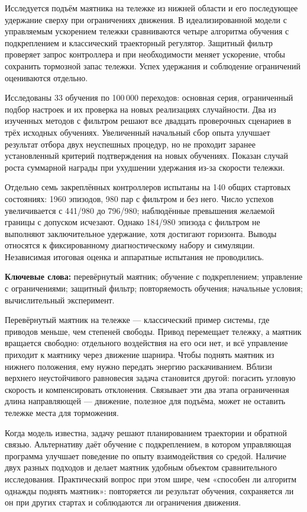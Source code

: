 Исследуется подъём маятника на тележке из нижней области и его последующее удержание сверху при ограничениях движения. В идеализированной модели с управляемым ускорением тележки сравниваются четыре алгоритма обучения с подкреплением и классический траекторный регулятор. Защитный фильтр проверяет запрос контроллера и при необходимости меняет ускорение, чтобы сохранить тормозной запас тележки. Успех удержания и соблюдение ограничений оцениваются отдельно.

Исследованы 33 обучения по 100\,000 переходов: основная серия, ограниченный подбор настроек и их проверка на новых реализациях случайности. Два из изученных методов с фильтром решают все двадцать проверочных сценариев в трёх исходных обучениях. Увеличенный начальный сбор опыта улучшает результат отбора двух неуспешных процедур, но не проходит заранее установленный критерий подтверждения на новых обучениях. Показан случай роста суммарной награды при ухудшении удержания из-за скорости тележки.

Отдельно семь закреплённых контроллеров испытаны на 140 общих стартовых состояниях: 1960 эпизодов, 980 пар с фильтром и без него. Число успехов увеличивается с 441/980 до 796/980; наблюдённые превышения желаемой границы с допуском исчезают. Однако 184/980 эпизода с фильтром не выполняют заключительное удержание, хотя достигают горизонта. Выводы относятся к фиксированному диагностическому набору и симуляции. Независимая итоговая оценка и аппаратные испытания не проводились.

\medskip\noindent\textbf{Ключевые слова:} перевёрнутый маятник; обучение с подкреплением; управление с ограничениями; защитный фильтр; повторяемость обучения; начальные условия; вычислительный эксперимент.

Перевёрнутый маятник на тележке — классический пример системы, где приводов
меньше, чем степеней свободы. Привод перемещает тележку, а маятник вращается свободно: отдельного воздействия на его оси нет, и всё управление приходит к маятнику через движение шарнира. Чтобы поднять маятник из нижнего положения, ему нужно передать энергию раскачиванием. Вблизи верхнего неустойчивого равновесия задача становится другой: погасить угловую скорость и компенсировать отклонения. Связывает эти два этапа ограниченная длина направляющей — движение, полезное для подъёма, может не оставить тележке места для торможения.

Когда модель известна, задачу решают планированием траектории и обратной связью. Альтернативу даёт обучение с подкреплением, в котором управляющая программа улучшает поведение по опыту взаимодействия со средой. Наличие двух разных подходов и делает маятник удобным объектом сравнительного исследования. Практический вопрос при этом шире, чем «способен ли алгоритм однажды поднять маятник»: повторяется ли результат обучения, сохраняется ли он при других стартах и соблюдаются ли ограничения движения.

